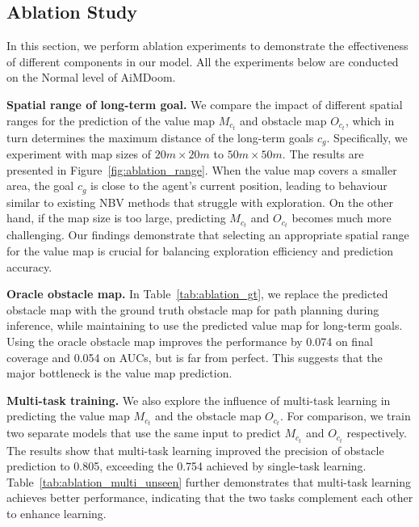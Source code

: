 
\subsection{Ablation Study}

In this section, we perform ablation experiments to demonstrate the effectiveness of different components in our model. All the experiments below are conducted on the Normal level of AiMDoom. 

\noindent \textbf{Spatial range of long-term goal.} 
We compare the impact of different spatial ranges for the prediction of the value map $M_{c_t}$ and obstacle map $O_{c_t}$, which in turn determines the maximum distance of the long-term goals $c_g$. 
Specifically, we experiment with map sizes of $20m \times 20m$ to $50m \times 50m$.
The results are presented in Figure~\ref{fig:ablation_range}.
When the value map covers a smaller area, the goal $c_g$ is close to the agent's current position, leading to behaviour similar to existing NBV methods that struggle with exploration. 
On the other hand, if the map size is too large, predicting $M_{c_t}$ and $O_{c_t}$ becomes much more challenging. 
Our findings demonstrate that selecting an appropriate spatial range for the value map is crucial for balancing exploration efficiency and prediction accuracy.





\noindent \textbf{Oracle obstacle map.}
In Table~\ref{tab:ablation_gt}, we replace the predicted obstacle map with the ground truth obstacle map for path planning during inference, while maintaining to use the predicted value map for long-term goals.
Using the oracle obstacle map improves the performance by 0.074 on final coverage and 0.054 on AUCs, but is far from perfect.
This suggests that the major bottleneck is the value map prediction.




\noindent \textbf{Multi-task training.} 
We also explore the influence of multi-task learning in predicting the value map $M_{c_t}$ and the obstacle map $O_{c_t}$. For comparison, we train two separate models that use the same input to predict $M_{c_t}$ and $O_{c_t}$ respectively. 
The results show that multi-task learning improved the precision of obstacle prediction to 0.805, exceeding the 0.754 achieved by single-task learning. Table~\ref{tab:ablation_multi_unseen} further demonstrates that multi-task learning achieves better performance, indicating that the two tasks complement each other to enhance learning.






